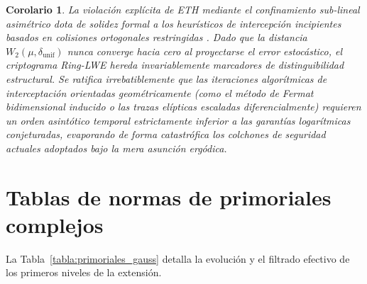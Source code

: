 \documentclass{article}
\numberwithin{equation}{section}
\theoremstyle{plain}
\newtheorem{corolario}[teorema]{Corolario}
\theoremstyle{definition}
\begin{document}
\begin{corolario}
La violación explícita de ETH mediante el confinamiento sub-lineal asimétrico dota de solidez formal a los heurísticos de intercepción incipientes basados en colisiones ortogonales restringidas \cite{Wenger2024}. Dado que la distancia $W_2(\mu, \delta_{\text{unif}})$ nunca converge hacia cero al proyectarse el error estocástico, el criptograma Ring-LWE hereda invariablemente marcadores de distinguibilidad estructural. Se ratifica irrebatiblemente que las iteraciones algorítmicas de interceptación orientadas geométricamente (como el método de Fermat bidimensional inducido o las trazas elípticas escaladas diferencialmente) requieren un orden asintótico temporal estrictamente inferior a las garantías logarítmicas conjeturadas, evaporando de forma catastrófica los colchones de seguridad actuales adoptados bajo la mera asunción ergódica.
\end{corolario}

\appendix

\section{Tablas de normas de primoriales complejos}
\label{apendice:tablas_primoriales}
La Tabla~\ref{tabla:primoriales_gauss} detalla la evolución y el filtrado efectivo de los primeros niveles de la extensión.

\begin{table}[h!]
\centering
\renewcommand{\arraystretch}{1.5}
\caption{Evolución asintótica de la sucesión de primoriales de Gauss. El Nivel 2 ($\Pi_2$) resalta analíticamente como el atractor estacionario óptimo que maximiza el cociente de filtrado frente a la divergencia combinatoria del grupo de clases.}
\label{tabla:primoriales_gauss}
\end{table}
\end{document}

